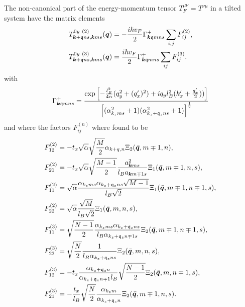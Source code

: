 \begin{summary}
The non-canonical part of the energy-momentum tensor \( T_F^{\mu \nu} = T^{\nu \mu} \) in a tilted system have the matrix elements
  \begin{align}
    T^{0y~(2)}_{\bm{k} + \mathfrak{q} ns, \bm{k} ms} (\bm{q})
    &= -\frac{ i \hbar v_{F} }{2}
      \Gamma _{\bm{k} \mathfrak{q} m n s}^+
      \sum\limits_{i,j}^{} F^{(2)}_{ij},\\
    T^{0y~(3)}_{\bm{k} + \mathfrak{q} ns, \bm{k} ms} (\bm{q})
    &= \frac{i \hbar v_F}{2}
      \Gamma ^{+}_{\bm{k} \mathfrak{q} m n s}
      \sum\limits_{ij}^{} F^{(3)}_{ij}.
  \end{align}
  with
  \[
    \Gamma _{\bm{k} \mathfrak{q} m n s}^{+} =
    \frac{
      \exp
      \left[
        - \frac{l_{B}^2}{4 \alpha } (q_{y}^2 + (q' _x)^2) +  i q_y l_B^2 (k' _x + \frac{q'_x}{2} )  )
      \right  ]
    }{
      \left[(\alpha_{k_z m s}^2 +1) (\alpha_{k_z + \mathfrak{q}_z ns} ^2 + 1)\right]^{\frac{1}{2}}
    }
  \]
  and where the factors \( F_{ij}^{(n)} \) where found to be
  \begin{align}
    F^{(2)}_{12}
    &= -t_x \sqrt{\alpha}  \sqrt{\frac{M}{2}} \alpha_{k+q, n} \Xi_2(\bar{\bm{q}}, m\mp 1, n),\\
    F^{(2)}_{21}
    &=
      -t_{x} \sqrt{\alpha} \sqrt{\frac{M-1}{2}} \frac{a_{\bm{k} m s}^2}{l_B a_{\bm{k} m \mp 1 s}}
      \Xi_{1} (\bar{\bm{q}}, m \mp 1, n, s),\\
    F^{(2)}_{11} &= \sqrt{\alpha}  \frac{\alpha_{k_z m s} \alpha_{k_z + \mathfrak{q}_z ns} \sqrt{M-1} }{ l_B \sqrt{2} }
                   \Xi_{1} (\bar{\bm{q}}, m\mp 1, n\mp 1, s),\\
    F^{(2)}_{22} &=
                   \sqrt{\alpha }
                   \frac{\sqrt{M} }{l_B \sqrt{2} }
                   \Xi_{1} ( \bar{\bm{q}}, m, n, s ),\\
    F^{(3)}_{11} &= \sqrt{\frac{N-1}{2}}
                   \frac{\alpha_{k_z m s} \alpha_{k_z + \mathfrak{q}_z n s}}{l_{B} \alpha_{k_z + \mathfrak{q}_z n \mp 1 s}}
                   \Xi_2( \bar{\bm{q}}, m\mp 1, n\mp 1, s ),\\
    F^{(3)}_{22} &= \sqrt{\frac{N}{2}}
                   \frac{1}{l_{B} \alpha_{k_z + \mathfrak{q}_z n s}}
                   \Xi_{2} (\bar{\bm{q}}, m, n, s),\\
    F^{(3)}_{12} &= -t_x \frac{\alpha_{k_z + \mathfrak{q}_z n}}{\alpha_{k_z + \mathfrak{q}_z n \mp 1} l_{B}}
                   \sqrt{\frac{N-1}{2}}
                   \Xi_{2} (\bar{\bm{q}}, m, n \mp 1, s),\\
    F^{(3)}_{21} &= -\frac{t_x}{l_{B}}
                   \sqrt{\frac{N}{2}}
                 \frac{\alpha_{k_z m}}{\alpha_{k_z + \mathfrak{q}_z n}}
                 \Xi_2 ( \bar{\bm{q}}, m \mp 1, n, s ).
\end{align}
\end{summary}

